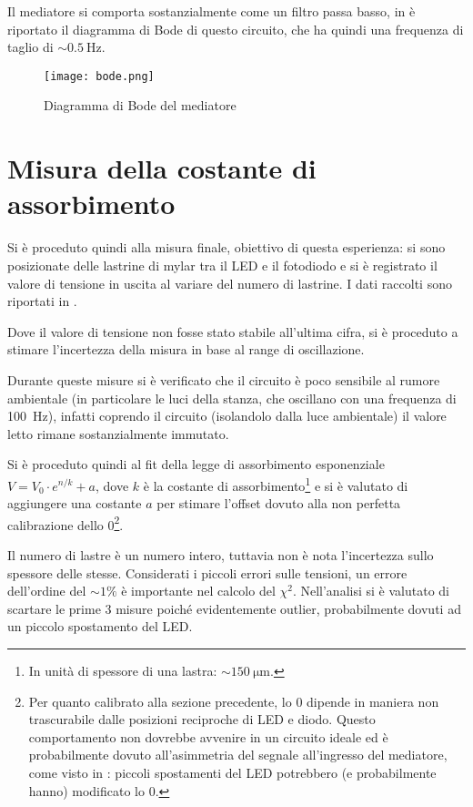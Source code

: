 Il mediatore si comporta sostanzialmente come un filtro passa basso, in  è riportato il diagramma di Bode di questo circuito, che ha quindi una frequenza di taglio di $\sim\SI{0.5}{\hertz}$.

\begin{figure}[h]
	\centering
	\texttt{[image: bode.png]}
	\caption{Diagramma di Bode del mediatore}
	\label{fig:bode}
\end{figure}


\section{Misura della costante di assorbimento}
Si è proceduto quindi alla misura finale, obiettivo di questa esperienza: si sono posizionate delle lastrine di mylar tra il LED e il fotodiodo e si è registrato il valore di tensione in uscita al variare del numero di lastrine. I dati raccolti sono riportati in .

Dove il valore di tensione non fosse stato stabile all'ultima cifra, si è proceduto a stimare l'incertezza della misura in base al range di oscillazione.

Durante queste misure si è verificato che il circuito è poco sensibile al rumore ambientale (in particolare le luci della stanza, che oscillano con una frequenza di \SI{100}{\hertz}), infatti coprendo il circuito (isolandolo dalla luce ambientale) il valore letto rimane sostanzialmente immutato.

Si è proceduto quindi al fit della legge di assorbimento esponenziale $V = V_0 \cdot e^{n/k}+a$, dove $k$ è la costante di assorbimento\footnote{In unità di spessore di una lastra: $\sim\SI{150}{\micro\meter}$.} e si è valutato di aggiungere una costante $a$ per stimare l'offset dovuto alla non perfetta calibrazione dello 0\footnote{Per quanto calibrato alla sezione precedente, lo 0 dipende in maniera non trascurabile dalle posizioni reciproche di LED e diodo. Questo comportamento non dovrebbe avvenire in un circuito ideale ed è probabilmente dovuto all'asimmetria del segnale all'ingresso del mediatore, come visto in : piccoli spostamenti del LED potrebbero (e probabilmente hanno) modificato lo 0.}.

Il numero di lastre è un numero intero, tuttavia non è nota l'incertezza sullo spessore delle stesse. Considerati i piccoli errori sulle tensioni, un errore dell'ordine del $\sim 1\%$ è importante nel calcolo del $\chi^2$.
Nell'analisi si è valutato di scartare le prime 3 misure poiché evidentemente outlier, probabilmente dovuti ad un piccolo spostamento del LED.

